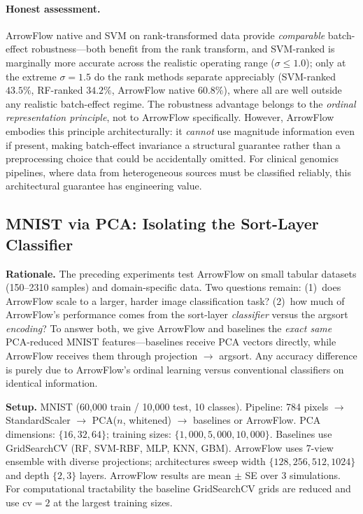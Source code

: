 \documentclass[12pt]{article}
\begin{document}
\paragraph{Honest assessment.} ArrowFlow native and SVM on rank-transformed data provide \emph{comparable} batch-effect robustness---both benefit from the rank transform, and SVM-ranked is marginally more accurate across the realistic operating range ($\sigma \le 1.0$); only at the extreme $\sigma = 1.5$ do the rank methods separate appreciably (SVM-ranked $43.5\%$, RF-ranked $34.2\%$, ArrowFlow native $60.8\%$), where all are well outside any realistic batch-effect regime. The robustness advantage belongs to the \emph{ordinal representation principle}, not to ArrowFlow specifically. However, ArrowFlow embodies this principle architecturally: it \emph{cannot} use magnitude information even if present, making batch-effect invariance a structural guarantee rather than a preprocessing choice that could be accidentally omitted. For clinical genomics pipelines, where data from heterogeneous sources must be classified reliably, this architectural guarantee has engineering value.

\subsection{MNIST via PCA: Isolating the Sort-Layer Classifier}
\label{sec:mnist-pca}

\textbf{Rationale.} The preceding experiments test ArrowFlow on small tabular datasets (150--2310 samples) and domain-specific data. Two questions remain: (1)~does ArrowFlow scale to a larger, harder image classification task? (2)~how much of ArrowFlow's performance comes from the sort-layer \emph{classifier} versus the argsort \emph{encoding}? To answer both, we give ArrowFlow and baselines the \emph{exact same} PCA-reduced MNIST features---baselines receive PCA vectors directly, while ArrowFlow receives them through projection $\to$ argsort. Any accuracy difference is purely due to ArrowFlow's ordinal learning versus conventional classifiers on identical information.

\textbf{Setup.} MNIST \citep{lecun1998mnist} (60{,}000 train / 10{,}000 test, 10 classes). Pipeline: 784 pixels $\to$ StandardScaler $\to$ PCA($n$, whitened) $\to$ baselines or ArrowFlow. PCA dimensions: $\{16, 32, 64\}$; training sizes: $\{1{,}000, 5{,}000, 10{,}000\}$. Baselines use GridSearchCV (RF, SVM-RBF, MLP, KNN, GBM). ArrowFlow uses 7-view ensemble with diverse projections; architectures sweep width $\{128, 256, 512, 1024\}$ and depth $\{2, 3\}$ layers. ArrowFlow results are mean $\pm$ SE over 3 simulations. For computational tractability the baseline GridSearchCV grids are reduced and use $\mathrm{cv}=2$ at the largest training sizes.
\end{document}
